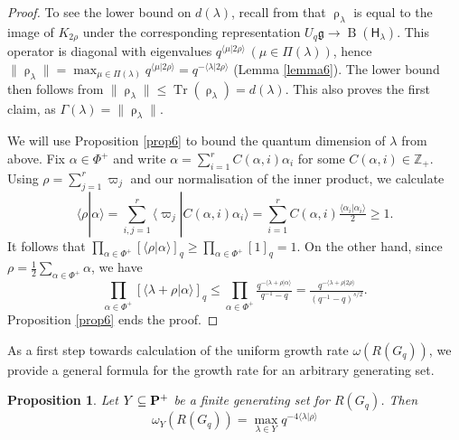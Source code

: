 \documentclass[11 pt, leqno]{amsart}
\newcommand{\mf}{\mathfrak}
\newcommand{\msf}{\mathsf}
\newcommand{\la}{\langle}
\newcommand{\ra}{\rangle}
\newcommand{\ZZ}{\mathbb{Z}}
\DeclareMathOperator{\Tr}{Tr}
\DeclareMathOperator{\B}{B}
\newtheorem{proposition}[theorem]{Proposition}
\theoremstyle{definition}
\numberwithin{equation}{section}
\begin{document}
\begin{proof}
To see the lower bound on $d(\lambda)$, recall from \cite[Lemma 4.4]{KrajczokSoltan} that $\uprho_{\lambda}$ is equal to the image of $K_{2\rho}$ under the corresponding representation $U_q\mf{g}\rightarrow \B(\msf{H}_\lambda)$. This operator is diagonal with eigenvalues $q^{\la \mu | 2\rho\ra}\,(\mu\in\Pi(\lambda))$, hence $\|\uprho_\lambda\|=\max_{\mu\in\Pi(\lambda)}q^{\la \mu| 2\rho\ra}=q^{-\la\lambda|2\rho\ra}$ (Lemma \ref{lemma6}). The lower bound then follows from $\|\uprho_\lambda\|\le \Tr(\uprho_\lambda)=d(\lambda)$. This also proves the first claim, as $\Gamma(\lambda)=\|\uprho_\lambda\|$.

We will use Proposition \ref{prop6} to bound the quantum dimension of $\lambda$ from above. Fix $\alpha\in \Phi^+$ and write $\alpha=\sum_{i=1}^{r} C(\alpha,i)\alpha_i$ for some $C(\alpha,i)\in \ZZ_+$. Using $\rho=\sum_{j=1}^{r}\varpi_j$ and our normalisation of the inner product, we calculate 
\[
\la\rho|\alpha\ra =\sum_{i,j=1}^{r}
\la \varpi_j|C(\alpha,i)\alpha_i\ra =
\sum_{i=1}^{r} C(\alpha,i) \tfrac{\la \alpha_i|\alpha_i\ra }{2} \ge 1.
\]
It follows that $\prod_{\alpha\in\Phi^+} [\la \rho|\alpha\ra]_q \ge \prod_{\alpha\in\Phi^+} [1]_q =1$. On the other hand, since $\rho=\tfrac{1}{2}\sum_{\alpha\in\Phi^+}\alpha$, we have
\[
\prod_{\alpha\in\Phi^+} [\la \lambda+\rho|\alpha\ra]_q \le 
\prod_{\alpha\in\Phi^+} \tfrac{q^{-\la \lambda+\rho|\alpha\ra }}{q^{-1}-q}=
\tfrac{q^{- \la \lambda+\rho|2 \rho\ra }}{(q^{-1}-q)^{s/2}}.
\]
Proposition \ref{prop6} ends the proof.
\end{proof}

As a first step towards calculation of the uniform growth rate $\omega(R(G_q))$, we provide a general formula for the growth rate for an arbitrary generating set.

\begin{proposition}\label{prop7}
Let $Y\subseteq \bf{P}^+$ be a finite generating set for $R(G_q)$. Then
\[
\omega_Y(R(G_q)) = 
\max_{\lambda\in Y} q^{-4\la\lambda|\rho\ra}
\]
\end{proposition}
\end{document}
